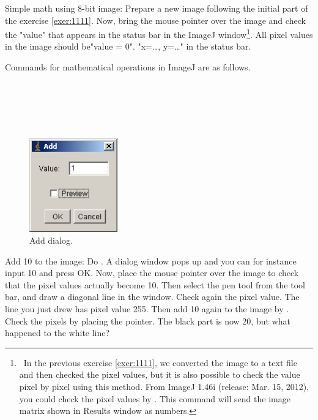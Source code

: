 \begin{indentexercise}{1}
Simple math using 8-bit image: Prepare a new
image following the initial part of the exercise \ref{exer:1111}. Now,
bring the mouse pointer over the image and check the
"value" that appears in the
status bar in the ImageJ window\footnote{\ In the previous exercise \ref{exer:1111}, 
we converted the image to a text file and then checked the pixel
values, but it is also possible to check the value pixel by pixel using
this method. From ImageJ 1.46i (release: Mar. 15, 2012), 
you could check the pixel values by . 
This command will send the image matrix shown in Results window as numbers.}. 
All pixel values in the image should be"value = 0".
"x=\ldots, y=\ldots " in the
status bar. 

Commands for mathematical operations in ImageJ are as follows. 

\\
\\ 
 \\
\\

\begin{figure}[htbp]
\begin{center}
\includegraphics[width=3.8cm]{fig/CMCIBasicCourse201102-img12.png}
\caption{ Add dialog.}
\label{fig:img12}
\end{center}
\end{figure}


Add 10 to the image: Do . A dialog window pops up and you can for instance 
input 10 and press OK. Now, place the mouse pointer over the image
to check that the pixel values actually become 10. Then select the pen
tool from the tool bar, and draw a diagonal line in the window. Check
again the pixel value. The line you just drew has pixel value 255. Then
add 10 again to the image by . Check the pixels by placing the pointer.
The black part is now 20, but what happened to the white line? 


\end{indentexercise}
